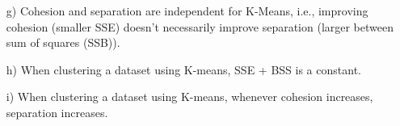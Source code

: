 \documentclass[11pt]{article}
\begin{document}
\begin{itemize}
  \item[g)]	Cohesion and separation are independent for K-Means, i.e., improving cohesion (smaller SSE) doesn’t necessarily improve separation (larger between sum of squares (SSB)).

  \item[h)]	When clustering a dataset using K-means, SSE + BSS is a constant.

  \item[i)]	When clustering a dataset using K-means, whenever cohesion increases, separation increases.


\end{itemize}
\end{document}

